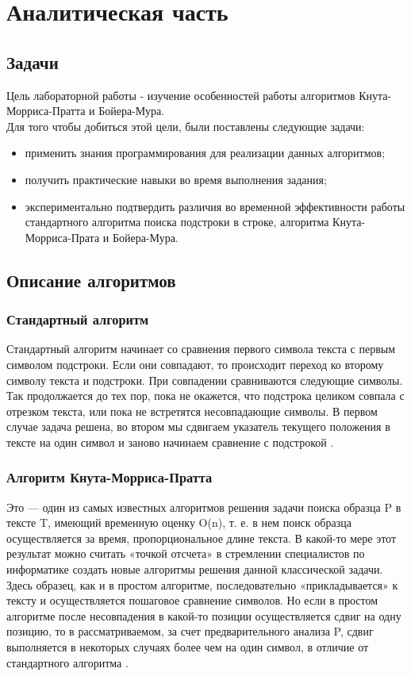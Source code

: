 \documentclass[12pt, a4paper]{report}
\begin{document}
    \chapter{Аналитическая часть}
	\section{Задачи}
	Цель лабораторной работы - изучение особенностей работы алгоритмов Кнута-Морриса-Пратта и Бойера-Мура.\\
	Для того чтобы добиться этой цели, были поставлены следующие задачи:
	\begin{itemize}
		\item применить знания программирования для реализации данных алгоритмов;
		\item получить практические навыки во время выполнения задания;
		\item экспериментально подтвердить различия во временной эффективности работы стандартного алгоритма поиска подстроки в строке, алгоритма Кнута-Морриса-Прата и Бойера-Мура.
	\end{itemize}

	\section{Описание алгоритмов}
	
	\subsection{Стандартный алгоритм}
	Стандартный алгоритм начинает со сравнения первого символа текста с первым символом подстроки. Если они совпадают, то происходит переход ко второму символу текста и подстроки. При совпадении сравниваются следующие символы. Так продолжается до тех пор, пока не окажется, что подстрока целиком совпала с отрезком текста, или пока не встретятся несовпадающие символы. В первом случае задача решена, во втором мы сдвигаем указатель текущего положения в тексте на один символ и заново начинаем сравнение с подстрокой \cite{macconnell}.
	
	\subsection{Алгоритм Кнута-Морриса-Пратта}
	Это — один из самых известных алгоритмов решения задачи поиска образца P в тексте T, имеющий временную оценку O(n), т. е. в нем поиск образца осуществляется за время, пропорциональное длине текста. В какой-то мере этот результат можно считать «точкой отсчета» в стремлении специалистов по информатике создать новые алгоритмы решения данной классической задачи. Здесь образец, как и в простом алгоритме, последовательно «прикладывается» к тексту и осуществляется пошаговое сравнение символов. Но если в простом алгоритме после несовпадения в какой-то позиции осуществляется сдвиг на одну позицию, то в рассматриваемом, за счет предварительного анализа P, сдвиг выполняется в некоторых случаях более чем на один символ, в отличие от стандартного алгоритма \cite{okulov}.
	
\end{document}
